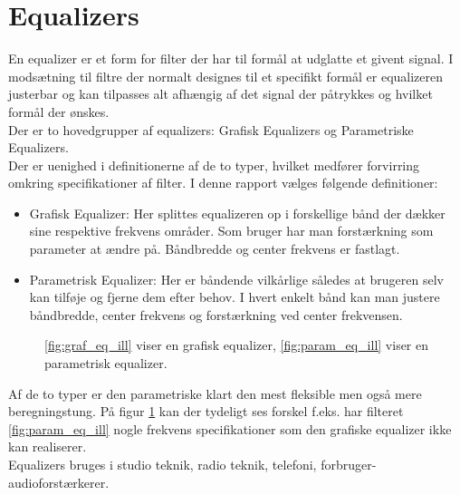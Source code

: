 \section{Equalizers}\label{sec:equalizer}

En equalizer er et form for filter der har til formål at 
udglatte et givent signal. I modsætning til filtre der normalt designes til et specifikt formål
 er equalizeren justerbar og kan tilpasses alt afhængig af det signal der påtrykkes og hvilket formål
 der ønskes.\\
Der er to hovedgrupper af equalizers: Grafisk Equalizers og Parametriske Equalizers.\\
Der er uenighed i definitionerne af de to typer, hvilket medfører forvirring omkring specifikationer af filter.
I denne rapport vælges følgende definitioner:
\begin{itemize}
\item Grafisk Equalizer: Her splittes equalizeren op i forskellige bånd der dækker sine respektive
frekvens områder. Som bruger har man forstærkning som parameter at ændre på. 
Båndbredde og center frekvens er fastlagt.
\item Parametrisk Equalizer: Her er båndende vilkårlige således at brugeren selv kan
tilføje og fjerne dem efter behov. I hvert enkelt bånd kan man justere båndbredde, center frekvens
og forstærkning ved center frekvensen. 
\end{itemize}  


\begin{figure}
	\centering
  	\caption{\ref{fig:graf_eq_ill} viser en grafisk equalizer, \ref{fig:param_eq_ill} viser en parametrisk equalizer.}
	\label{fig:eq_ill}
\end{figure}
\FloatBlock

Af de to typer er den parametriske klart den mest fleksible men
også mere beregningstung. På figur \ref{fig:eq_ill}
kan der tydeligt ses forskel f.eks. har filteret \ref{fig:param_eq_ill}
nogle frekvens specifikationer som den grafiske equalizer ikke kan realiserer.\\

Equalizers bruges i studio teknik, radio teknik, telefoni, forbruger-audioforstærkerer. 
